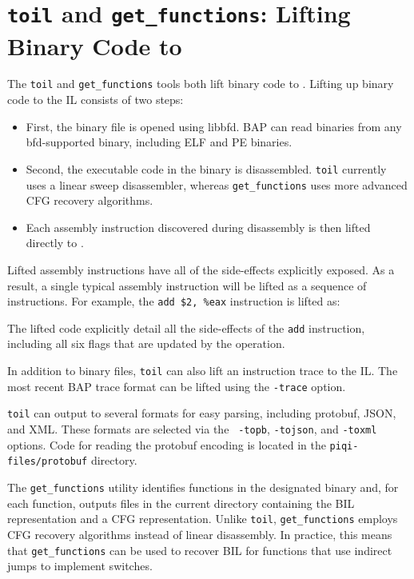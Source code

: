 \section{\texttt{toil} and \texttt{get\_functions}: Lifting Binary Code to \bil}

The \texttt{toil} and \texttt{get\_functions} tools both lift binary
code to \bil.  Lifting up binary code to the IL consists of two steps:
\begin{itemize}
\item First, the binary file is opened using libbfd. BAP can read
  binaries from any bfd-supported binary, including ELF and PE
  binaries.

\item Second, the executable code in the binary is disassembled.
  \texttt{toil} currently uses a linear sweep disassembler, whereas
  \texttt{get\_functions} uses more advanced CFG recovery algorithms.

\item Each assembly instruction discovered during disassembly is then
  lifted directly to \bil.
\end{itemize}

Lifted assembly instructions have all of the side-effects explicitly
exposed.  As a result, a single typical assembly instruction will be
lifted as a sequence of \bil instructions.  For example, the {\tt add
  \$2, \%eax} instruction is lifted as:

\begin{centering}
\begin{scriptsize}

\end{scriptsize}
\end{centering}
%
The lifted \bil code explicitly detail all the side-effects of the
{\tt add} instruction, including all six flags that are updated by the
operation.

In addition to binary files, {\tt toil} can also lift an instruction
trace to the IL.  The most recent BAP trace format can be lifted using
the {\tt -trace} option.

{\tt toil} can output to several formats for easy parsing, including
protobuf, JSON, and XML.  These formats are selected via the {\tt
  -topb}, {\tt -tojson}, and {\tt -toxml} options.  Code for reading
the protobuf encoding is located in the {\tt piqi-files/protobuf}
directory.

The \texttt{get\_functions} utility identifies functions in the
designated binary and, for each function, outputs files in the current
directory containing the BIL representation and a CFG representation.
Unlike \texttt{toil}, \texttt{get\_functions} employs CFG recovery
algorithms instead of linear disassembly.  In practice, this means
that \texttt{get\_functions} can be used to recover BIL for functions
that use indirect jumps to implement switches.



